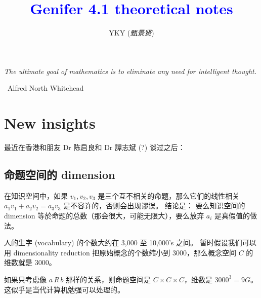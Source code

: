 \documentclass[12pt]{article}
\title{\textcolor{blue}{Genifer 4.1 theoretical notes}}
\author{YKY (\textit{甄景贤})}
\newcommand{\tab}{\hspace*{1cm}}
\begin{document}
\tab\tab\tab \parbox{9cm}{\textit{The ultimate goal of mathematics is to eliminate any need for intelligent thought.}}
\begin{flushright}
\textemdash\, Alfred North Whitehead \hspace{1cm}
\end{flushright}

\sffamily

{\let\newpage\relax\maketitle}

\maketitle
\setlength{\parindent}{0em}
\setlength{\parskip}{1.5ex plus0.5ex minus1.2ex}

\section{New insights}

最近在香港和朋友 Dr 陈启良和 Dr 譚志斌 (?) 谈过之后：

\subsection{命题空间的 dimension}

在知识空间中，如果 $v_1, v_2, v_3$ 是三个互不相关的命题，那么它们的线性相关 $ a_1 v_1 + a_2 v_2 = a_3 v_3 $ 是不容许的，否则会出现谬误。 结论是： 要么知识空间的 dimension 等於命题的总数（那会很大，可能无限大），要么放弃 $a_i$ 是真假值的做法。

人的生字 (vocabulary) 的个数大约在 3,000 至 10,000's 之间。  暂时假设我们可以用 dimensionality reduction 把原始概念的个数缩小到 3000，那么概念空间 $C$ 的维数就是 3000。

如果只考虑像 $a\, R\, b$ 那样的关系，则命题空间是 $C \times C \times C$，维数是 $3000^3 = 9G $。 这似乎是当代计算机勉强可以处理的。
\end{document}
